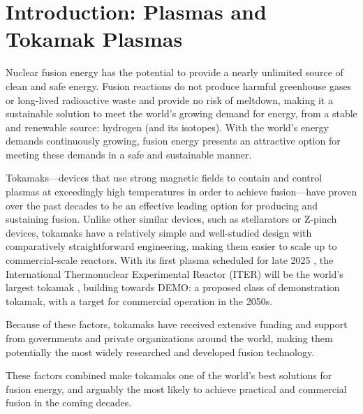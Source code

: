 \chapter{Introduction: Plasmas and Tokamak Plasmas}
    Nuclear fusion energy has the potential to provide a nearly unlimited source of clean and safe energy. Fusion reactions do not produce harmful greenhouse gases or long-lived radioactive waste and provide no risk of meltdown, making it a sustainable solution to meet the world's growing demand for energy, from a stable and renewable source: hydrogen (and its isotopes). With the world's energy demands continuously growing, fusion energy presents an attractive option for meeting these demands in a safe and sustainable manner.

    \shortline
      
    Tokamaks---devices that use strong magnetic fields to contain and control plasmas at exceedingly high temperatures in order to achieve fusion---have proven over the past decades to be an effective leading option for producing and sustaining fusion. Unlike other similar devices, such as stellarators or Z-pinch devices, tokamaks have a relatively simple and well-studied  design with comparatively straightforward engineering, making them easier to scale up to commercial-scale reactors. With its first plasma scheduled for late 2025 \cite{ITER_schedule}, the International Thermonuclear Experimental Reactor (ITER) will be the world's largest tokamak \cite{Meade_2009, ITER_plan}, building towards DEMO: a proposed class of demonstration tokamak, with a target for commercial operation in the 2050s.

    Because of these factors, tokamaks have received extensive funding and support from governments and private organizations around the world, making them potentially the most widely researched and developed fusion technology.

    These factors combined make tokamaks one of the world's best solutions for fusion energy, and arguably the most likely to achieve practical and commercial fusion in the coming decades.

